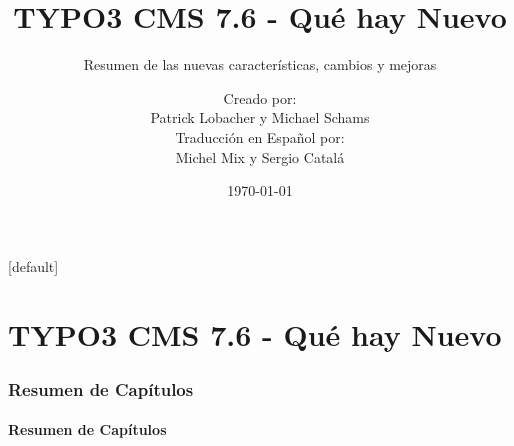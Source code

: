 \documentclass[t]{beamer}
\title{TYPO3 CMS 7.6 - Qué hay Nuevo}
\subtitle{Resumen de las nuevas características, cambios y mejoras}
\author{
	\centerline{Creado por:}
	\centerline{Patrick Lobacher y Michael Schams}
	\vspace{0.4cm}
	\centerline{Traducción en Español por:}
	\centerline{Michel Mix y Sergio Catalá}
}
\date{\today}
\begin{document}
\sharefont


\begingroup
	[default]
	\begin{frame}
		\titlepage
	\end{frame}
\endgroup


\section*{TYPO3 CMS 7.6 - Qué hay Nuevo}
\begin{frame}[fragile]
	\frametitle{Resumen de Capítulos}
	\framesubtitle{Resumen de Capítulos}

	\tableofcontents

\end{frame}










\end{document}
